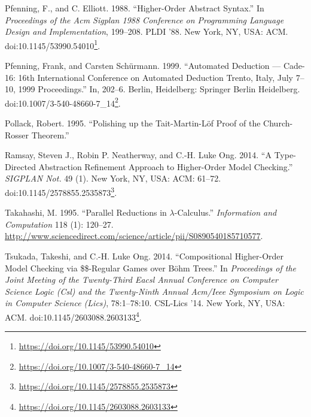 \documentclass[a4paper, 12pt, twoside]{style/ociamthesis}
\theoremstyle{plain}
\theoremstyle{definition}
\theoremstyle{remark}
\renewcommand{\href}[2]{#2\footnote{\url{#1}}}
\begin{document}
\hypertarget{ref-pfenning88}{}
Pfenning, F., and C. Elliott. 1988. ``Higher-Order Abstract Syntax.'' In
\emph{Proceedings of the Acm Sigplan 1988 Conference on Programming
Language Design and Implementation}, 199--208. PLDI '88. New York, NY,
USA: ACM.
doi:\href{https://doi.org/10.1145/53990.54010}{10.1145/53990.54010}.

\hypertarget{ref-pfenning99}{}
Pfenning, Frank, and Carsten Schürmann. 1999. ``Automated Deduction ---
Cade-16: 16th International Conference on Automated Deduction Trento,
Italy, July 7--10, 1999 Proceedings.'' In, 202--6. Berlin, Heidelberg:
Springer Berlin Heidelberg.
doi:\href{https://doi.org/10.1007/3-540-48660-7_14}{10.1007/3-540-48660-7\_14}.

\hypertarget{ref-pollack95}{}
Pollack, Robert. 1995. ``Polishing up the Tait-Martin-Löf Proof of the
Church-Rosser Theorem.''

\hypertarget{ref-ramsay14}{}
Ramsay, Steven J., Robin P. Neatherway, and C.-H. Luke Ong. 2014. ``A
Type-Directed Abstraction Refinement Approach to Higher-Order Model
Checking.'' \emph{SIGPLAN Not.} 49 (1). New York, NY, USA: ACM: 61--72.
doi:\href{https://doi.org/10.1145/2578855.2535873}{10.1145/2578855.2535873}.

\hypertarget{ref-takahashi95}{}
Takahashi, M. 1995. ``Parallel Reductions in \(\lambda\)-Calculus.''
\emph{Information and Computation} 118 (1): 120--27.
\url{http://www.sciencedirect.com/science/article/pii/S0890540185710577}.

\hypertarget{ref-tsukada14}{}
Tsukada, Takeshi, and C.-H. Luke Ong. 2014. ``Compositional Higher-Order
Model Checking via \$\$-Regular Games over Böhm Trees.'' In
\emph{Proceedings of the Joint Meeting of the Twenty-Third Eacsl Annual
Conference on Computer Science Logic (Csl) and the Twenty-Ninth Annual
Acm/Ieee Symposium on Logic in Computer Science (Lics)}, 78:1--78:10.
CSL-Lics '14. New York, NY, USA: ACM.
doi:\href{https://doi.org/10.1145/2603088.2603133}{10.1145/2603088.2603133}.

\end{document}

